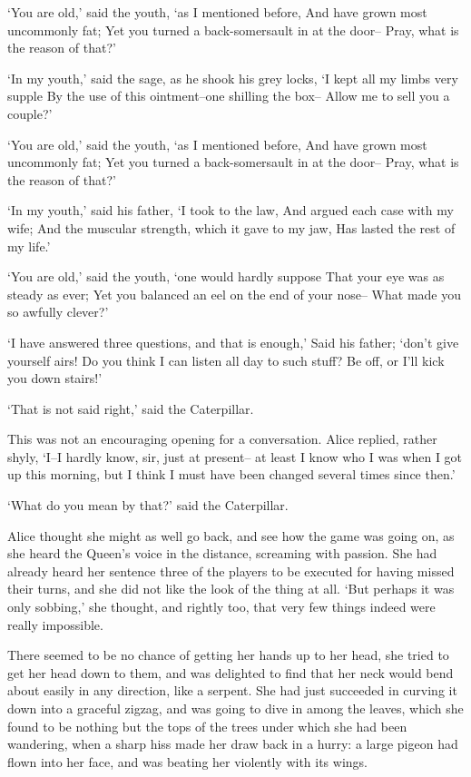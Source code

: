\documentclass[statementpaper,twoside,openany]{memoir}
\begin{document}
`You are old,' said the youth, `as I mentioned before, And have grown most uncommonly fat; Yet you turned a back-somersault in at the door-- Pray, what is the reason of that?'

`In my youth,' said the sage, as he shook his grey locks, `I kept all my limbs very supple By the use of this ointment--one shilling the box-- Allow me to sell you a couple?'

`You are old,' said the youth, `as I mentioned before, And have grown most uncommonly fat; Yet you turned a back-somersault in at the door-- Pray, what is the reason of that?'

`In my youth,' said his father, `I took to the law, And argued each case with my wife; And the muscular strength, which it gave to my jaw, Has lasted the rest of my life.'

`You are old,' said the youth, `one would hardly suppose That your eye was as steady as ever; Yet you balanced an eel on the end of your nose-- What made you so awfully clever?'

`I have answered three questions, and that is enough,' Said his father; `don't give yourself airs! Do you think I can listen all day to such stuff? Be off, or I'll kick you down stairs!'

`That is not said right,' said the Caterpillar.

This was not an encouraging opening for a conversation. Alice replied, rather shyly, `I--I hardly know, sir, just at present-- at least I know who I was when I got up this morning, but I think I must have been changed several times since then.'

`What do you mean by that?' said the Caterpillar.

Alice thought she might as well go back, and see how the game was going on, as she heard the Queen's voice in the distance, screaming with passion. She had already heard her sentence three of the players to be executed for having missed their turns, and she did not like the look of the thing at all. `But perhaps it was only sobbing,' she thought, and rightly too, that very few things indeed were really impossible.

There seemed to be no chance of getting her hands up to her head, she tried to get her head down to them, and was delighted to find that her neck would bend about easily in any direction, like a serpent. She had just succeeded in curving it down into a graceful zigzag, and was going to dive in among the leaves, which she found to be nothing but the tops of the trees under which she had been wandering, when a sharp hiss made her draw back in a hurry: a large pigeon had flown into her face, and was beating her violently with its wings.
\end{document}
